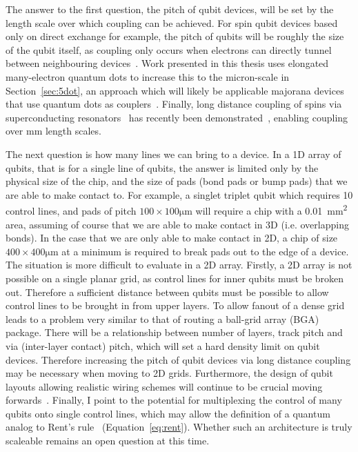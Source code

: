 The answer to the first question, the pitch of qubit devices, will be set by the length scale over which coupling can be achieved. For spin qubit devices based only
on direct exchange for example, the pitch of qubits will be roughly the size of the qubit itself, as coupling only occurs when electrons can directly tunnel between
neighbouring devices~\cite{PhysRevB.86.085423}. Work presented in this thesis uses elongated many-electron quantum dots to increase this to the micron-scale in
Section~\ref{sec:5dot}, an approach which will likely be applicable majorana devices that use quantum dots as couplers~\cite{PhysRevB.95.235305}. Finally, long
distance coupling of spins via superconducting resonators~\cite{PhysRevB.97.235409} has recently been demonstrated~\cite{2019arXiv190500776B}, enabling coupling
over \si{\milli\meter} length scales.

The next question is how many lines we can bring to a device. In a 1D array of qubits, that is for a single line of qubits, the answer is limited only by the
physical size of the chip, and the size of pads (bond pads or bump pads) that we are able to make contact to. For example, a singlet triplet qubit which requires
10 control lines, and pads of pitch $100\times100\si{\micro\meter}$ will require a chip with a \SI{0.01}{\square\milli\meter} area, assuming of course that we are
able to make contact in 3D (i.e. overlapping bonds). In the case that we are only able to make contact in 2D, a chip of size $400\times400\si{\micro\meter}$ at a
minimum is required to break pads out to the edge of a device. The situation is more difficult to evaluate in a 2D array. Firstly, a 2D array is not possible on
a single planar grid, as control lines for inner qubits must be broken out. Therefore a sufficient distance between qubits must be possible to allow control lines
to be brought in from upper layers. To allow fanout of a dense grid leads to a problem very similar to that of routing a ball-grid array (BGA) package. There will
be a relationship between number of layers, track pitch and via (inter-layer contact) pitch, which will set a hard density limit on qubit devices. Therefore
increasing the pitch of qubit devices via long distance coupling may be necessary when moving to 2D grids. Furthermore, the design of qubit layouts allowing
realistic wiring schemes will continue to be crucial moving forwards~\cite{10.1038/s41534-018-0074-2}. Finally, I point to the potential for multiplexing the
control of many qubits onto single control lines, which may allow the definition of a quantum analog to Rent's rule~\cite{FRANKE20191} (Equation~\ref{eq:rent}).
Whether such an architecture is truly scaleable remains an open question at this time.


